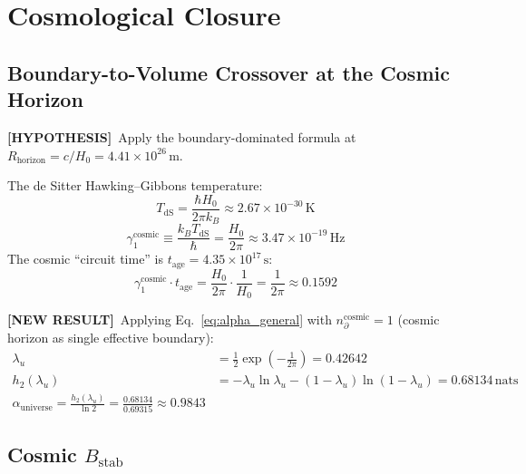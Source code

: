 \documentclass[11pt,letterpaper]{article}
\newcommand{\HYP}{\textcolor{hypothesis}{\textbf{[HYPOTHESIS]}}}
\newcommand{\NEW}{\textcolor{newresult}{\textbf{[NEW RESULT]}}}
\newcommand{\htwo}{h_2}
\newcommand{\nprt}{n_{\partial}}
\newcommand{\gamone}{\gamma_1}
\begin{document}
\newpage
\section{Cosmological Closure}

\subsection{Boundary-to-Volume Crossover at the Cosmic Horizon}

\HYP\ Apply the boundary-dominated formula at $R_{\mathrm{horizon}} = c/H_0 = 4.41\times 10^{26}\,\text{m}$.

The de Sitter Hawking--Gibbons temperature:
\begin{equation}
  T_{\mathrm{dS}} = \frac{\hbar H_0}{2\pi k_B} \approx 2.67\times 10^{-30}\,\text{K}
\end{equation}
\begin{equation}
  \gamone^{\mathrm{cosmic}} \equiv \frac{k_B T_{\mathrm{dS}}}{\hbar} = \frac{H_0}{2\pi} \approx 3.47\times 10^{-19}\,\text{Hz}
\end{equation}
The cosmic ``circuit time'' is $t_{\mathrm{age}} = 4.35\times 10^{17}\,\text{s}$:
\begin{equation}
  \gamone^{\mathrm{cosmic}} \cdot t_{\mathrm{age}} = \frac{H_0}{2\pi}\cdot\frac{1}{H_0} = \frac{1}{2\pi} \approx 0.1592
  \label{eq:cosmic_gt}
\end{equation}

\NEW\ Applying Eq.\ \eqref{eq:alpha_general} with $\nprt^{\mathrm{cosmic}} = 1$ (cosmic horizon as single effective boundary):
\begin{align}
  \lambda_u &= \frac{1}{2}\exp\!\left(-\frac{1}{2\pi}\right) = 0.42642 \label{eq:lam_u}\\
  \htwo(\lambda_u) &= -\lambda_u\ln\lambda_u - (1-\lambda_u)\ln(1-\lambda_u) = 0.68134\,\text{nats} \label{eq:h2_u}\\
  \boxed{\alpha_{\mathrm{universe}} = \frac{\htwo(\lambda_u)}{\ln 2} = \frac{0.68134}{0.69315} \approx 0.9843} \label{eq:alpha_universe}
\end{align}

\subsection{Cosmic $B_{\mathrm{stab}}$}
\end{document}
